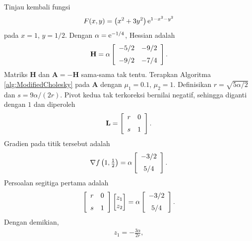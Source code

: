 \begin{example} Tinjau kembali fungsi
\begin{displaymath}
F(x,y)=\left(x^2+3y^2\right){\rm e}^{1-x^2-y^2}
\end{displaymath}
pada $x=1$, $y=1/2$. Dengan $\alpha={\rm e}^{-1/4}$, Hessian adalah
\begin{displaymath}
\mathbf{H}=\alpha\left[\begin{array}{cc}-5/2&-9/2\\ \noalign{\medskip}-9/2&-7/4\end{array}\right].
\end{displaymath}
Matriks $\mathbf{H}$ dan $\mathbf{A}=-\mathbf{H}$ sama-sama tak tentu. Terapkan Algoritma \ref{alg:ModifiedCholesky} pada $\mathbf{A}$ dengan $\mu_1=0.1$, $\mu_2=1$. Definisikan $r=\sqrt{5\alpha/2}$ dan $s=9\alpha/(2r)$. Pivot kedua tak terkoreksi bernilai negatif, sehingga diganti dengan $1$ dan diperoleh
\begin{displaymath}
\mathbf{L}=\left[\begin{array}{cc}r&0\\ \noalign{\medskip}s&1\end{array}\right].
\end{displaymath}
Gradien pada titik tersebut adalah
\begin{displaymath}
\nabla f\left(1,\tfrac12\right)=
\alpha\left[\begin{array}{c}-3/2\\ \noalign{\medskip}5/4\end{array}\right].
\end{displaymath}
Persoalan segitiga pertama adalah
\begin{equation}
\left[\begin{array}{cc}r&0\\ \noalign{\medskip}s&1\end{array}\right]
\begin{bmatrix}z_1\\z_2\end{bmatrix}
=\alpha\left[\begin{array}{c}-3/2\\ \noalign{\medskip}5/4\end{array}\right].
\end{equation}
Dengan demikian,
\begin{gather*}
z_1=-\frac{3\alpha}{2r},\\

\end{gather*}
\end{example}
